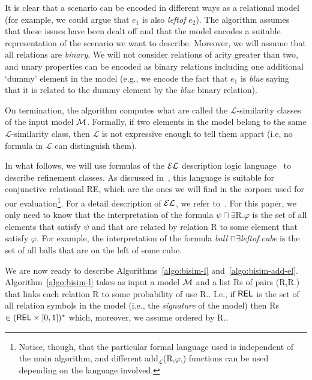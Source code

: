 It is clear that a scenario can be encoded in different ways as a relational model (for example, we could argue that $e_1$ is also \emph{leftof} $e_2$).  The algorithm assumes that these issues have been dealt off and that the model encodes a suitable representation of the scenario we want to describe.  Moreover, we will assume that all relations are \emph{binary}.  We will not consider relations of arity greater than two, and unary
properties can be encoded as binary relations including one additional `dummy' element in the model (e.g., we encode the fact that $e_1$ is \emph{blue} saying that it is related to the dummy element by the \emph{blue} binary relation).

On termination, the algorithm computes what are called the $\mathcal{L}$-similarity classes of the input model $\mathcal{M}$. Formally, if two elements in the model belong to the same $\mathcal{L}$-similarity class, then $\mathcal{L}$ is not expressive enough to tell them appart (i.e, no formula in $\mathcal{L}$ can distinguish them). 

In what follows, we will use formulas of the $\mathcal{EL}$ description logic language~\cite{baad:desc03} to describe refinement classes.  As discussed in~\cite{arec2:2008:Areces}, this language is suitable for conjunctive relational RE, which are the ones we will find in the corpora used for our evaluation\footnote{Notice, though, that the particular formal language used is independent of the main algorithm, and different add$_{\mathcal{L}}$(R,$\varphi$,\RE) functions can be used depending on the language involved.}. For a detail description of $\mathcal{EL}$, we refer to~\cite{baad:desc03}.  For this paper, we only need to know that the interpretation of the formula $\psi \sqcap \exists$R.$\varphi$ is the set of all elements that satisfy $\psi$ and that are related by relation R to some element that satisfy $\varphi$. For example, the interpretation of the formula \emph{ball} $\sqcap \exists$\emph{leftof}.\emph{cube} is the set of all balls that are on the left of some cube.  

We are now ready to describe Algorithms~\ref{algo:bisim-l} and~\ref{algo:bisim-add-el}. Algorithm~\ref{algo:bisim-l} takes as input a model $\mathcal{M}$ and a list Rs of pairs (R,R.\puse) that links each relation R to some probability of use R.\puse. I.e., if $\textsf{REL}$ is the set of all relation symbols in the model (i.e., the \emph{signature} of the model) then Rs $\in (\textsf{REL} \times [0,1])^*$ which, moreover, we assume ordered by R.\puse. 

